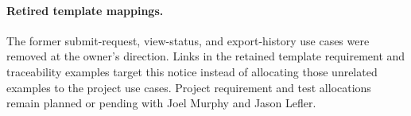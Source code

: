 \paragraph{Retired template mappings.}
\label{Section:RetiredTemplateUseCases}
The former submit-request, view-status, and export-history use cases were
removed at the owner's direction. Links in the retained template requirement
and traceability examples target this notice instead of allocating those
unrelated examples to the project use cases. Project requirement and
test allocations remain planned or pending with Joel Murphy and Jason Lefler.
